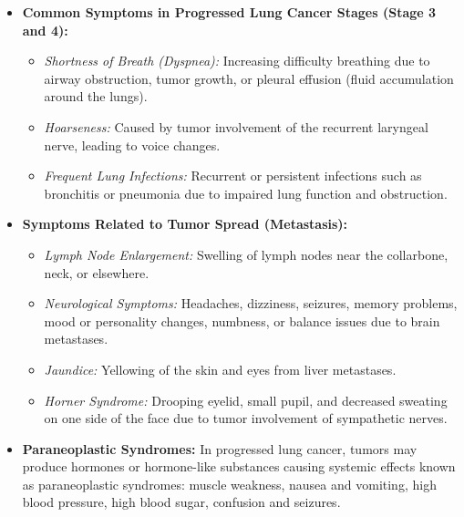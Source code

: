 \newpage
\begin{itemize}
    \item \textbf{Common Symptoms in Progressed Lung Cancer Stages (Stage 3 and 4):}
        \begin{itemize}
            \item \textit{Shortness of Breath (Dyspnea):} Increasing difficulty breathing due to 
            airway obstruction, tumor growth, or pleural effusion (fluid accumulation around the 
            lungs).

            \item \textit{Hoarseness:} Caused by tumor involvement of the recurrent laryngeal nerve, 
            leading to voice changes.

            \item \textit{Frequent Lung Infections:} Recurrent or persistent infections such as 
            bronchitis or pneumonia due to impaired lung function and obstruction.
        \end{itemize}
    
    \item \textbf{Symptoms Related to Tumor Spread (Metastasis):}
        \begin{itemize}
            \item \textit{Lymph Node Enlargement:} Swelling of lymph nodes near the collarbone, 
            neck, or elsewhere.

            \item \textit{Neurological Symptoms:} Headaches, dizziness, seizures, memory problems, 
            mood or personality changes, numbness, or balance issues due to brain metastases.

            \item \textit{Jaundice:} Yellowing of the skin and eyes from liver metastases.

            \item \textit{Horner Syndrome:} Drooping eyelid, small pupil, and decreased sweating on 
            one side of the face due to tumor involvement of sympathetic nerves.
        \end{itemize}
    
    \item \textbf{Paraneoplastic Syndromes:}
    In progressed lung cancer, tumors may produce hormones or hormone-like substances causing 
    systemic effects known as paraneoplastic syndromes: muscle weakness, nausea and vomiting, high 
    blood pressure, high blood sugar, confusion and seizures.  
\end{itemize}
